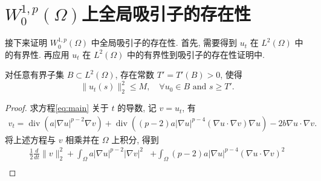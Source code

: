 \documentclass[oneside,longtitle]{LZUthesis}
\newtheorem{proofpart}{part}
\numberwithin{equation}{chapter}
\newcommand*\abs[1]{\lvert#1\rvert}
\newcommand*\norm[1]{\lVert#1\rVert}
\newcommand*\Brace[1]{\lbrace#1\rbrace}
\newcommand\R{\mathbb{R}}
\DeclareMathOperator{\Div}{div}
\begin{document}
\section{$W_0^{1,p}(\Omega)$上全局吸引子的存在性}
接下来证明 $W_0^{1,p}(\Omega)$ 中全局吸引子的存在性. 首先, 需要得到 $u_t$ 在 $L^2(\Omega)$ 中的有界性.
再应用 $u_t$ 在 $L^2(\Omega)$ 中的有界性到吸引子的存在性证明中.
\begin{theorem}\label{thm:ut_L2_bd}
	对任意有界子集 $B \subset L^2(\Omega)$,
	存在常数 $T' = T'(B) > 0$, 使得
	\begin{equation*}
		\norm{u_t(s)}_2^2 \leq M, \quad \forall u_0 \in B \text{ and } s \geq T'.
	\end{equation*}
\end{theorem}
\begin{proof}
	求方程\eqref{eq:main} 关于 $t$ 的导数, 记 $v = u_t$, 有
	\begin{equation*}
		\begin{split}
			v_t
			= \Div\left(a\abs{\nabla u}^{p-2}\nabla v\right)
			+ \Div\left(\left(p-2\right)a \abs{\nabla u}^{p-4}\left(\nabla u \cdot \nabla v\right)\nabla u\right)
			- 2b\nabla u \cdot \nabla v.
		\end{split}
	\end{equation*}
	将上述方程与 $v$ 相乘并在 $\Omega$ 上积分, 得到
	\begin{equation*}
		\begin{split}
			\frac{1}{2}\frac{d}{dt}\norm{v}_2^2
			+ \int_{\Omega}a\abs{\nabla u}^{p-2}\abs{\nabla v}^2
			&+ \int_{\Omega}\left(p-2\right)a\abs{\nabla u}^{p-4}\left(\nabla u
			\cdot \nabla v\right)^2\\

\end{split}
\end{equation*}
\end{proof}
\end{document}
